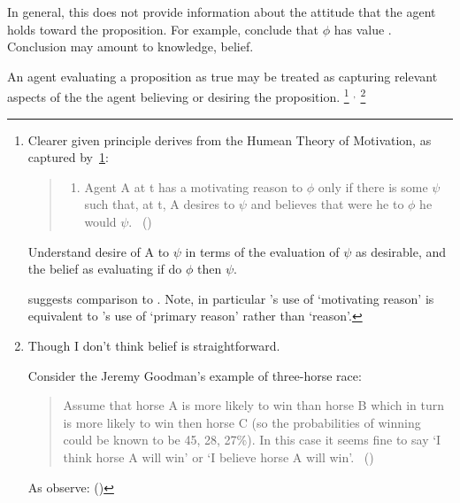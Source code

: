 \begin{note}

  In general, this does not provide information about the attitude that the agent holds toward the proposition.
  For example, conclude that \(\phi\) has value .
  Conclusion may amount to knowledge, belief.

  An agent evaluating a proposition as true may be treated as capturing relevant aspects of the the agent believing or desiring the proposition.%
  \footnote{
    \nocite{Hume:2011aa}
    Clearer given principle \citeauthor{Smith:1987vk} derives from the Humean Theory of Motivation, as captured by~\ref{Smithh:HtM:2}:
    \begin{quote}
      \begin{enumerate}[label=\textsc{P1}., ref=(\textsc{P1})]
      \item
        \label{Smithh:HtM:2}
        Agent A at t has a motivating reason to \(\phi\) only if there is some \(\psi\) such that, at t, A desires to \(\psi\) and believes that were he to \(\phi\) he would \(\psi\).%
        \mbox{ }\hfill\mbox{(\citeyear[36]{Smith:1987vk})}
      \end{enumerate}
    \end{quote}

    Understand desire of A to \(\psi\) in terms of the evaluation of \(\psi\) as desirable, and the belief as evaluating if do \(\phi\) then \(\psi\).

    \citeauthor{Smith:1987vk} suggests comparison to \textcite{Davidson:1963aa}.
    Note, in particular \citeauthor{Smith:1987vk}'s use of `motivating reason' is equivalent to \citeauthor{Davidson:1963aa}'s use of `primary reason' rather than `reason'.
  }
  \(^{,}\)%
  \footnote{
    \label{fn:belief-is-difficult}
    Though I don't think belief is straightforward.

    Consider the Jeremy Goodman's example of three-horse race:
    \begin{quote}
      Assume that horse A is more likely to win than horse B which in turn is more likely to win then horse C (so the probabilities of winning could be known to be 45, 28, 27\%).
      In this case it seems fine to say `I think horse A will win' or `I believe horse A will win'.%
      \mbox{ }\hfill\mbox{(\cite[1440]{Hawthorne:2016wv})}
    \end{quote}
    As \citeauthor{Hawthorne:2016wv} observe: 
    (\citeyear[1440, fn.17]{Hawthorne:2016wv})
  }


\end{note}
